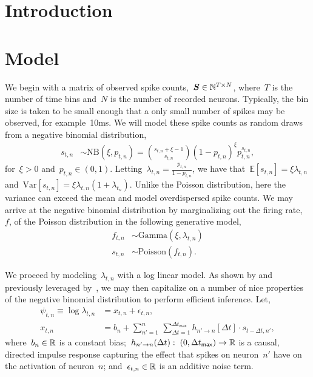 \documentclass[aos]{imsart} %
\begin{document}
\section{Introduction}

\section{Model}
We begin with a matrix of observed spike counts,~$\boldsymbol{S}\in\mathbb{N}^{T\times N}$, where~$T$ is the number of time bins and~$N$ is the number of recorded neurons. Typically, the bin size is taken to be small enough that a only small number of spikes may be observed, for example~10ms. We will model these spike counts as random draws from a negative binomial distribution,
\begin{align}
s_{t,n} &\sim \text{NB}(\xi, p_{t,n}) = {{s_{t,n}+\xi-1}\choose{s_{t,n}}} (1-p_{t,n})^\xi p_{t,n}^{s_{t,n}},
\end{align}
for~$\xi>0$ and~${p_{t,n}\in(0,1)}$. Letting~${\lambda_{t,n}=\frac{p_{t,n}}{1-p_{t,n}}}$, we have that~$\mathbb{E}[s_{t,n}]=\xi\lambda_{t,n}$ and~${\text{Var}[s_{t,n}] = \xi\lambda_{t,n}(1+\lambda_{t_n})}$. Unlike the Poisson distribution, here the variance can exceed the mean and model overdispersed spike counts. We may arrive at the negative binomial distribution by marginalizing out the firing rate,~$f$, of the Poisson distribution in the following generative model,
\begin{align}
f_{t,n} &\sim \text{Gamma}(\xi, \lambda_{t,n}) \\
s_{t,n} &\sim \text{Poisson}(f_{t,n}).
\end{align}

We proceed by modeling~$\lambda_{t,n}$ with a log linear model. As shown by \citet{Zhou2012} and previously leveraged by~\citet{Scott2012}, we may then capitalize on a number of nice properties of the negative binomial distribution to perform efficient inference. Let,
\begin{align}
\psi_{t,n} \equiv \log \lambda_{t,n} &= x_{t,n} + \epsilon_{t,n}, \\
x_{t,n} &= b_{n} + \sum_{n'=1}^n \, \sum_{\Delta t=1}^{\Delta t_{\mathsf{max}}} h_{n'\to n}[\Delta t] \cdot s_{t-\Delta t, n'},
\end{align}
where~$b_n\in \mathbb{R}$ is a constant bias;\;~${h_{n'\to n}(\Delta t):\; (0,\Delta t_{\mathsf{max}})\to \mathbb{R}}$ is a causal, directed impulse response capturing the effect that spikes on neuron~$n'$ have on the activation of neuron~$n$;\; and~${\epsilon_{t,n}\in\mathbb{R}}$ is an additive noise term. 
\end{document}
